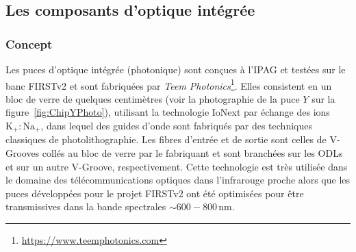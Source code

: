 \subsection{Les composants d'optique intégrée}
\label{sec:PhotonicChip}





\subsubsection{Concept}
\label{sec:ChipConcept}

Les puces d'optique intégrée (photonique) sont conçues à l'\ac{IPAG} et testées sur le banc \ac{FIRSTv2} \citep{martin2020, martin2022b, lallement2022} et sont fabriquées par \textit{Teem Photonics}\footnote{\url{https://www.teemphotonics.com}}. Elles consistent en un bloc de verre de quelques centimètres (voir la photographie de la puce $Y$ sur la figure~\ref{fig:ChipYPhoto}), utilisant la technologie IoNext par échange des ions $\text{K}_+ : \text{Na}_+$, dans lequel des guides d'onde sont fabriqués par des techniques classiques de photolithographie. Les fibres d'entrée et de sortie sont celles de V-Grooves collés au bloc de verre par le fabriquant et sont branchées sur les \ac{ODL}s et sur un autre V-Groove, respectivement. Cette technologie est très utilisée dans le domaine des télécommunications optiques dans l'infrarouge proche alors que les puces développées pour le projet \ac{FIRSTv2} ont été optimisées pour être transmissives dans la bande spectrales $\sim 600 - 800 \,$nm.

